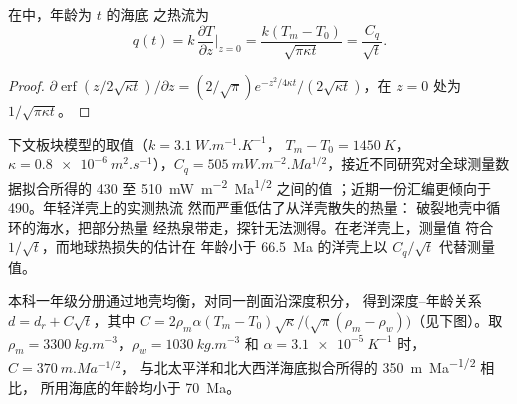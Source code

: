 \begin{proposition}[热流–年龄关系]\label{prop:b3:lithosphere-thermal-models:heat-flow}
在中，年龄为 $t$ 的海底
之热流为
\[
  q(t) = k\,\frac{\partial T}{\partial z}\Big|_{z=0}
  = \frac{k(T_m - T_0)}{\sqrt{\pi\kappa t}} = \frac{C_q}{\sqrt t} .
\]
\end{proposition}

\begin{proof}
$\partial\operatorname{erf}(z/2\sqrt{\kappa t})/\partial z = (2/\sqrt\pi)
e^{-z^2/4\kappa t}/(2\sqrt{\kappa t})$，在 $z = 0$ 处为 $1/\sqrt{\pi\kappa
t}$。
\end{proof}

下文板块模型的取值（$k = \qty{3.1}{W.m^{-1}.K^{-1}}$，
$T_m - T_0 = \qty{1450}{K}$，$\kappa = \qty{0.8e-6}{m^2.s^{-1}}$），$C_q =
\qty{505}{mW.m^{-2}.Ma^{1/2}}$，接近不同研究对全球测量数据拟合所得的 430 至
\qty{510}{mW.m^{-2}.Ma^{1/2}} 之间的值
；近期一份汇编更倾向于 \num{490}。年轻洋壳上的实测热流
然而严重低估了从洋壳散失的热量：
破裂地壳中循环的海水，把部分热量
经热泉带走，探针无法测得。在老洋壳上，测量值
符合 $1/\sqrt t$，而地球热损失的估计在
年龄小于 \qty{66.5}{Ma} 的洋壳上以 $C_q/\sqrt t$ 代替测量值。

本科一年级分册通过地壳均衡，对同一剖面沿深度积分，
得到深度–年龄关系 $d = d_r + C\sqrt t$，其中 $C = 2\rho_m\alpha(T_m -
T_0)\sqrt\kappa/\bigl(\sqrt\pi(\rho_m - \rho_w)\bigr)$（见下图）。取
$\rho_m = \qty{3300}{kg.m^{-3}}$，$\rho_w = \qty{1030}{kg.m^{-3}}$ 和 $\alpha =
\qty{3.1e-5}{K^{-1}}$ 时，$C = \qty{370}{m.Ma^{-1/2}}$，
与北太平洋和北大西洋海底拟合所得的 \qty{350}{m.Ma^{-1/2}} 相比，
所用海底的年龄均小于 \qty{70}{Ma}。

